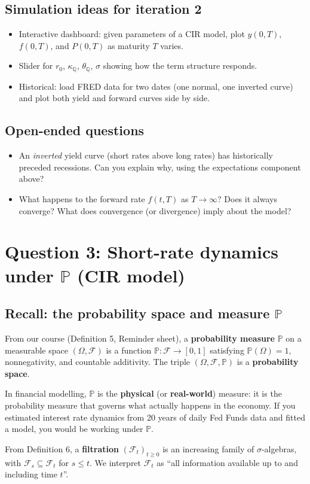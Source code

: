 \documentclass[11pt]{article}
\newcommand{\PP}{\mathbb{P}}
\newcommand{\QQ}{\mathbb{Q}}
\newcommand{\FF}{\mathcal{F}}
\begin{document}
\subsection{Simulation ideas for iteration 2}
\begin{itemize}
  \item Interactive dashboard: given parameters of a CIR model, plot $y(0,T)$,
  $f(0,T)$, and $P(0,T)$ as maturity $T$ varies.
  \item Slider for $r_0$, $\kappa_{\QQ}$, $\theta_{\QQ}$, $\sigma$ showing
  how the term structure responds.
  \item Historical: load FRED data for two dates (one normal, one inverted
  curve) and plot both yield and forward curves side by side.
\end{itemize}

\subsection*{Open-ended questions}
\begin{itemize}
  \item An \emph{inverted} yield curve (short rates above long rates) has
  historically preceded recessions.  Can you explain why, using the
  expectations component above?
  \item What happens to the forward rate $f(t,T)$ as $T \to \infty$?
  Does it always converge?  What does convergence (or divergence) imply
  about the model?
\end{itemize}

\newpage
\section{Question 3: Short-rate dynamics under $\PP$ (CIR model)}

\subsection{Recall: the probability space and measure $\PP$}

\begin{recall_box}
From our course (Definition 5, Reminder sheet), a \textbf{probability
measure} $\PP$ on a measurable space $(\Omega,\FF)$ is a function
$\PP:\FF\to[0,1]$ satisfying $\PP(\Omega)=1$, nonnegativity, and
countable additivity.  The triple $(\Omega,\FF,\PP)$ is a
\textbf{probability space}.

In financial modelling, $\PP$ is the \textbf{physical} (or
\textbf{real-world}) measure: it is the probability measure that governs
what actually happens in the economy.  If you estimated interest rate
dynamics from 20 years of daily Fed Funds data and fitted a model, you
would be working under $\PP$.

From Definition 6, a \textbf{filtration} $(\FF_t)_{t\ge 0}$ is an
increasing family of $\sigma$-algebras, with $\FF_s \subseteq \FF_t$ for
$s \le t$.  We interpret $\FF_t$ as ``all information available up to and
including time $t$''.
\end{recall_box}
\end{document}

